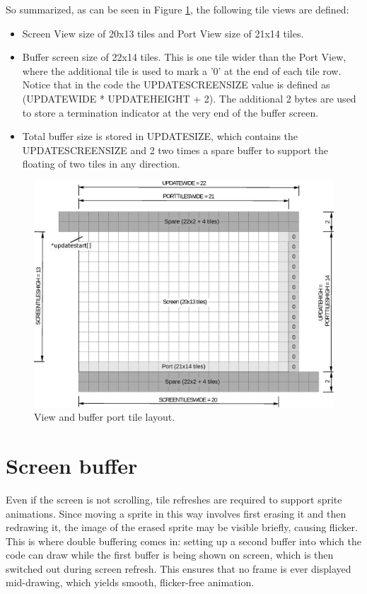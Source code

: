 \documentclass[book.tex]{subfiles}
\begin{document}
So summarized, as can be seen in Figure \ref{fig:screen_setup}, the following tile views are defined:
\begin{itemize}
\item Screen View size of 20x13 tiles and Port View size of 21x14 tiles.
\item Buffer screen size of 22x14 tiles. This is one tile wider than the Port View, where the additional tile is used to mark a '0' at the end of each tile row. Notice that in the code the UPDATESCREENSIZE value is defined as (UPDATEWIDE * UPDATEHEIGHT + 2). The additional 2 bytes are used to store a termination indicator at the very end of the buffer screen.
\item Total buffer size is stored in UPDATESIZE, which contains the UPDATESCREENSIZE and 2 two times a spare buffer to support the floating of two tiles in any direction. 
\end{itemize}
\par
 
\begin{figure}[H]
\centering
\includegraphics[width=\textwidth]{imgs/drawings/buffer_tile_layout.eps}
\caption{View and buffer port tile layout.}
\label{fig:screen_setup}
\end{figure}



\section{Screen buffer}
Even if the screen is not scrolling, tile refreshes are required to support sprite animations. Since moving a sprite in this way involves first erasing it and then redrawing it, the image of the erased sprite may be visible briefly, causing flicker. This is where double buffering comes in: setting up a second buffer into which the code can draw while the first buffer is being shown on screen, which is then switched out during screen refresh. This ensures that no frame is ever displayed mid-drawing, which yields smooth, flicker-free animation.\\
\end{document}
